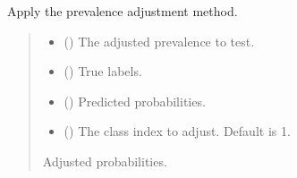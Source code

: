 \documentclass[letterpaper,10pt,english]{sphinxmanual}
\begin{document}
\begin{fulllineitems}
\label{\detokenize{calzone:calzone.utils.apply_prevalence_adjustment}}
\pysigstartsignatures
{}
\pysigstopsignatures
\sphinxAtStartPar
Apply the prevalence adjustment method.
\begin{quote}\begin{description}
\begin{itemize}
\item {} 
\sphinxAtStartPar
{} () \textendash{} The adjusted prevalence to test.

\item {} 
\sphinxAtStartPar
{} () \textendash{} True labels.

\item {} 
\sphinxAtStartPar
{} () \textendash{} Predicted probabilities.

\item {} 
\sphinxAtStartPar
{} () \textendash{} The class index to adjust. Default is 1.

\end{itemize}

\sphinxAtStartPar
{} \textendash{} Adjusted probabilities.

\end{description}\end{quote}

\end{fulllineitems}

\end{document}
